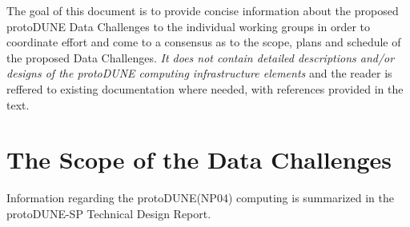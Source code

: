 \documentclass[pdftex,12pt,letter]{article}
\newcommand{\pd}{protoDUNE\xspace}
\begin{document}
The goal of this document is to provide concise information about the proposed \pd Data Challenges
to the individual working groups in order to coordinate effort and come to a consensus as to the scope,
plans and schedule of the proposed Data Challenges. \textit{It does not contain detailed descriptions
and/or designs of the \pd computing
infrastructure elements} and the reader is reffered to existing documentation where
needed, with references provided in the text.

\section{The Scope of the Data Challenges}
Information regarding the \pd (NP04) computing is summarized in the \pd-SP Technical Design Report\cite{docdb1794}.
\end{document}
